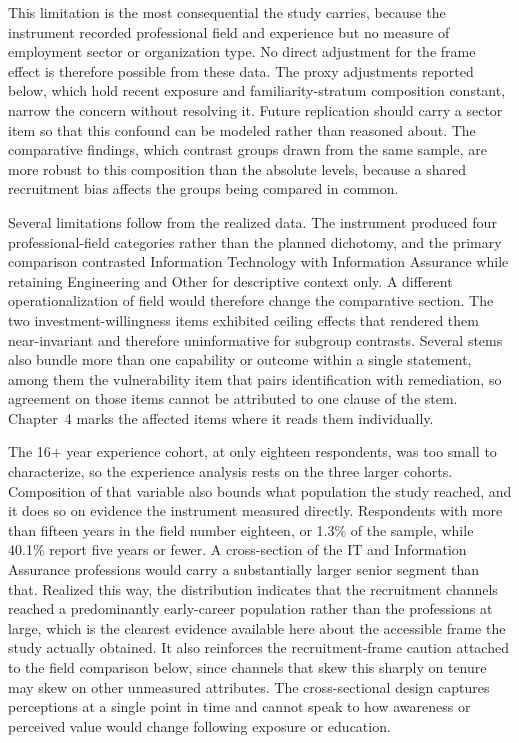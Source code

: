 This limitation is the most consequential the study carries, because the instrument recorded professional field and experience but no measure of employment sector or organization type. No direct adjustment for the frame effect is therefore possible from these data. The proxy adjustments reported below, which hold recent exposure and familiarity-stratum composition constant, narrow the concern without resolving it. Future replication should carry a sector item so that this confound can be modeled rather than reasoned about. The comparative findings, which contrast groups drawn from the same sample, are more robust to this composition than the absolute levels, because a shared recruitment bias affects the groups being compared in common.

Several limitations follow from the realized data. The instrument produced four professional-field categories rather than the planned dichotomy, and the primary comparison contrasted Information Technology with Information Assurance while retaining Engineering and Other for descriptive context only. A different operationalization of field would therefore change the comparative section. The two investment-willingness items exhibited ceiling effects that rendered them near-invariant and therefore uninformative for subgroup contrasts. Several stems also bundle more than one capability or outcome within a single statement, among them the vulnerability item that pairs identification with remediation, so agreement on those items cannot be attributed to one clause of the stem. Chapter~4 marks the affected items where it reads them individually.

The 16+ year experience cohort, at only eighteen respondents, was too small to characterize, so the experience analysis rests on the three larger cohorts. Composition of that variable also bounds what population the study reached, and it does so on evidence the instrument measured directly. Respondents with more than fifteen years in the field number eighteen, or 1.3\% of the sample, while 40.1\% report five years or fewer. A cross-section of the IT and Information Assurance professions would carry a substantially larger senior segment than that. Realized this way, the distribution indicates that the recruitment channels reached a predominantly early-career population rather than the professions at large, which is the clearest evidence available here about the accessible frame the study actually obtained. It also reinforces the recruitment-frame caution attached to the field comparison below, since channels that skew this sharply on tenure may skew on other unmeasured attributes. The cross-sectional design captures perceptions at a single point in time and cannot speak to how awareness or perceived value would change following exposure or education.

